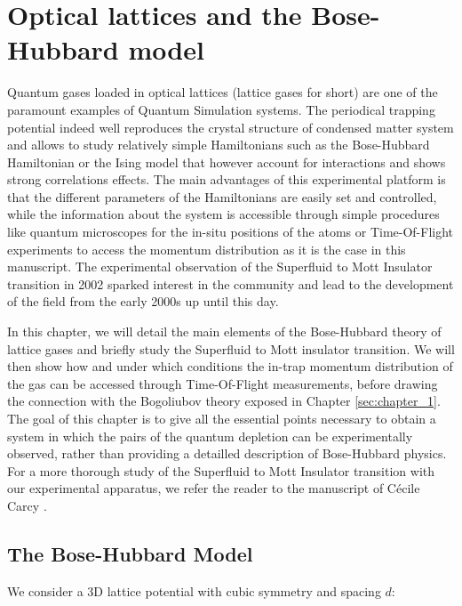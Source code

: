 \chapter{Optical lattices and the Bose-Hubbard model}

\label{sec:chapter_2}

Quantum gases loaded in optical lattices (lattice gases for short) are one of the paramount examples of Quantum Simulation systems. The periodical trapping potential indeed well reproduces the crystal structure of condensed matter system and allows to study relatively simple Hamiltonians such as the Bose-Hubbard Hamiltonian or the Ising model \cite{bloch2005ultracold} that however account for interactions and shows strong correlations effects. The main advantages of this experimental platform is that the different parameters of the Hamiltonians are easily set and controlled, while the information about the system is accessible through simple procedures like quantum microscopes \cite{bakr2009quantum} for the in-situ positions of the atoms or Time-Of-Flight experiments to access the momentum distribution as it is the case in this manuscript. The experimental observation of the Superfluid to Mott Insulator transition in 2002 \cite{greiner2002quantum} sparked interest in the community and lead to the development of the field from the early 2000s up until this day.

In this chapter, we will detail the main elements of the Bose-Hubbard theory of lattice gases and briefly study the Superfluid to Mott insulator transition. We will then show how and under which conditions the in-trap momentum distribution of the gas can be accessed through Time-Of-Flight measurements, before drawing the connection with the Bogoliubov theory exposed in Chapter \ref{sec:chapter_1}. The goal of this chapter is to give all the essential points necessary to obtain a system in which the \kmk pairs of the quantum depletion can be experimentally observed, rather than providing a detailled description of Bose-Hubbard physics. For a more thorough study of the Superfluid to Mott Insulator transition with our experimental apparatus, we refer the reader to the manuscript of Cécile Carcy \cite{carcy_these}.




\section{The Bose-Hubbard Model}

We consider a 3D lattice potential with cubic symmetry and spacing $d$:

